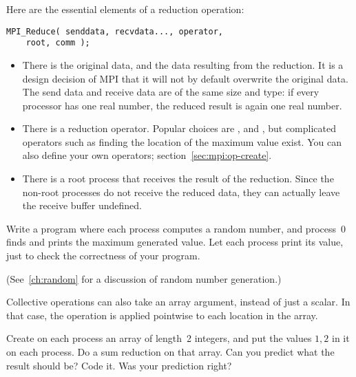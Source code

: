 Here are the essential elements of a reduction operation:
\begin{lstlisting}
MPI_Reduce( senddata, recvdata..., operator,
    root, comm ); 
\end{lstlisting}
\begin{itemize}
\item There is the original data, and the data resulting from the
  reduction. It is a design decision of MPI that it will not by
  default overwrite the original data. The send data and receive data
  are of the same size and type: if every processor has one real
  number, the reduced result is again one real number.
\item There is a reduction operator. Popular choices are
  ,  and
  , but complicated operators such as finding
  the location of the maximum value exist. You can also define your
  own operators; section~\ref{sec:mpi:op-create}.
\item There is a root process that receives the result of the
  reduction. Since the non-root processes do not receive the reduced
  data, they can actually leave the receive buffer undefined.
\end{itemize}



\begin{exercise}
  \label{ex:randommax}
  Write a program where each process computes a random number, and process~0
  finds and prints the maximum generated value. Let each process print its value,
  just to check the correctness of your program.
\begin{book}
  (See~\ref{ch:random} for a discussion of random number generation.)
\end{book}
\end{exercise}

Collective operations can also take an array argument, instead of just a scalar.
In that case, the operation is applied pointwise to each location in the array.

\begin{exercise}
  \label{ex:randomcoord}
  Create on each process an array of length~2 integers, and put the
  values $1,2$ in it on each process. Do a sum reduction on that
  array. Can you predict what the result should be?  Code it. Was your
  prediction right?
\end{exercise}

